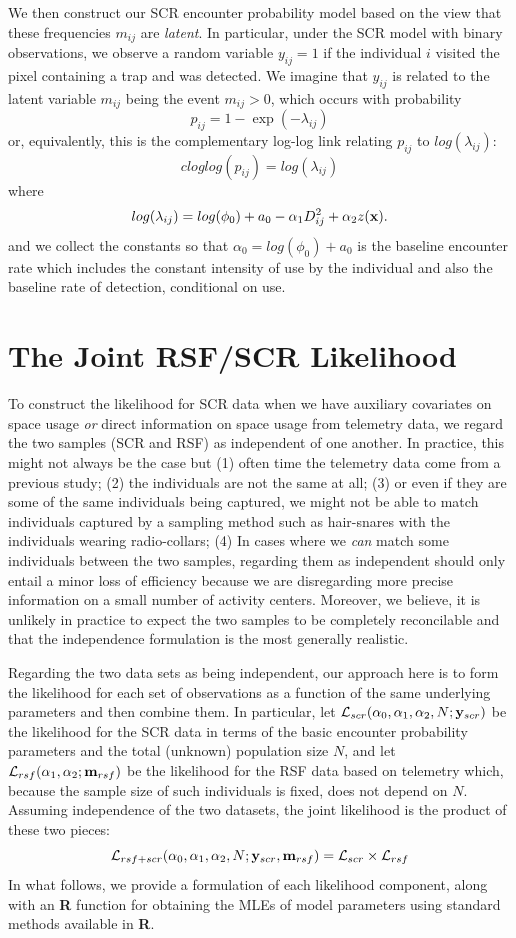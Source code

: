 We then construct our SCR encounter probability model based on the
view that these frequencies $m_{ij}$ are {\it latent}. In particular,
under the SCR model with binary observations,
 we observe a random variable
$y_{ij} = 1$  if the individual $i$ visited the pixel
containing a trap and was detected.
We imagine that $y_{ij}$ is related to the latent variable $m_{ij}$ being the
event $m_{ij}>0$, which occurs with probability
\[
 p_{ij} = 1-\exp(- \lambda_{ij})
\]
or, equivalently, this is the complementary log-log link relating
$p_{ij}$ to $log(\lambda_{ij})$:
\[
 cloglog(p_{ij}) = log(\lambda_{ij})
\]
where
\[
 log(\lambda_{ij}) = log(\phi_{0}) + a_{0} -\alpha_{1} D_{ij}^{2} +  \alpha_{2} z({\bf x}).
\]
and we collect the constants so that $\alpha_{0} = log(\phi_{0}) +
a_{0}$ is the
 baseline encounter rate which includes
the constant intensity of use by the individual and also the baseline
rate of detection, conditional on use.


\section{The Joint RSF/SCR Likelihood}

To construct the likelihood for SCR data when we have auxiliary
covariates on space usage {\it or} direct information on space usage
from telemetry data, we regard the two samples (SCR and RSF) as
independent of one another. In practice, this might not always be the
case but (1) often time the telemetry data come from a previous study;
(2) the individuals are not the same at all; (3) or even if they are
some of the same individuals being captured, we might not be able to
match individuals captured by a sampling method such as hair-snares
with the individuals wearing radio-collars; (4) In cases where we {\it
  can} match some individuals between the two samples, regarding them as
independent should only entail a minor
loss of efficiency
because we are disregarding more precise information on a small number
of activity centers. Moreover, we believe, it is unlikely in practice
to expect the two samples to be completely reconcilable and that the
independence formulation is the most generally realistic.

Regarding the two data sets as being independent, our approach here
is to form the likelihood for each set of observations as a function
of the same underlying parameters and then combine them. In
particular, let ${\cal L}_{scr}(\alpha_{0}, \alpha_{1}, \alpha_{2}, N;
{\bf y}_{scr})$
be the likelihood for the SCR data in terms of the basic encounter
probability parameters and the total (unknown) population size $N$,
and let ${\cal L}_{rsf}(\alpha_{1},\alpha_{2}; {\bf m}_{rsf})$ be the
likelihood for the RSF data based on telemetry which, because the
sample size of such individuals is fixed, does not depend on $N$.
Assuming independence of the two datasets, the
joint likelihood is the product of these two pieces:
\[
{\cal L}_{rsf+scr}(\alpha_{0},\alpha_{1},\alpha_{2},N; {\bf y}_{scr},{\bf
  m}_{rsf})  = {\cal L}_{scr} \times {\cal L}_{rsf}
\]
In what follows, we provide a formulation of each likelihood
component, along with an {\bf R} function for obtaining the MLEs of
model parameters using standard methods available in {\bf R}.

